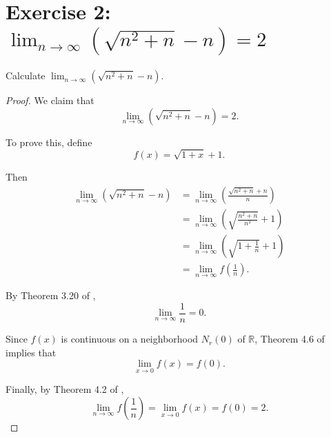 \documentclass{amsbook}
\theoremstyle{definition}
\theoremstyle{remark}
\numberwithin{section}{chapter}
\numberwithin{equation}{chapter}
\begin{document}
\section{Exercise 2: $\lim_{n\to\infty} (\sqrt{n^2 + n} - n)=2$}
Calculate $\lim_{n\to\infty} (\sqrt{n^2 + n} - n)$.
\begin{proof}
We claim that\[
\lim_{n\to\infty}\left(\sqrt{n^2 + n} - n\right)=2.
\]

To prove this, define\[
f(x)=\sqrt{1+x}+1.
\]

Then \[
\begin{split}
\lim_{n\to\infty}\left(\sqrt{n^2 + n} - n\right)&= \lim_{n\to\infty}\left(\frac{\sqrt{n^2 + n} + n}{n}\right)\\
&= \lim_{n\to\infty}\left(\sqrt{\frac{n^2+n}{n^2}}+1\right)\\
&= \lim_{n\to\infty}\left(\sqrt{1+\frac{1}{n}}+1\right)\\
&= \lim_{n\to\infty}f(\frac{1}{n}).
\end{split}
\]

By Theorem 3.20 of \cite{rudin1976principles}, \[
\lim_{n\to\infty}\frac{1}{n}=0.
\]

Since $f(x)$ is continuous on a neighborhood $N_r(0)$ of $\mathbb{R}$, Theorem 4.6 of \cite{rudin1976principles} implies that \[
\lim_{x\to 0}f(x)=f(0).
\]

Finally, by Theorem 4.2 of \cite{rudin1976principles}, \[
\lim_{n\to\infty}f(\frac{1}{n})=\lim_{x\to 0}f(x)=f(0)=2.
\]
\end{proof}
\end{document}

